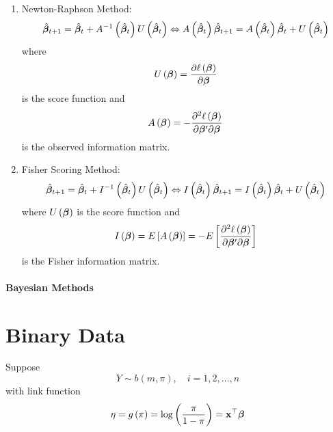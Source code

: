 \begin{enumerate}
	\item Newton-Raphson Method:
	      \begin{equation}
		      \hat{\boldsymbol{\beta}}_{t+1}=\hat{\boldsymbol{\beta}}_{t}+A^{-1}\left(\hat{\boldsymbol{\beta}}_{t}\right)U\left(\hat{\boldsymbol{\beta}}_{t}\right)\Leftrightarrow A\left(\hat{\boldsymbol{\beta}}_{t}\right)\hat{\boldsymbol{\beta}}_{t+1}=A\left(\hat{\boldsymbol{\beta}}_{t}\right)\hat{\boldsymbol{\beta}}_{t}+U\left(\hat{\boldsymbol{\beta}}_{t}\right)
	      \end{equation}
	      where
	      \begin{equation}
		      U\left(\boldsymbol{\beta}\right)=\frac{\partial\ell\left(\boldsymbol{\beta}\right)}{\partial\boldsymbol{\beta}}
	      \end{equation}
	      is the score function and
	      \begin{equation}
		      A\left(\boldsymbol{\beta}\right)=-\frac{\partial^{2}\ell\left(\boldsymbol{\beta}\right)}{\partial\boldsymbol{\beta}^{\prime}\partial\boldsymbol{\beta}}
	      \end{equation}
	      is the observed information matrix.
	\item Fisher Scoring Method:
	      \begin{equation}
		      \hat{\boldsymbol{\beta}}_{t+1}=\hat{\boldsymbol{\beta}}_{t}+I^{-1}\left(\hat{\boldsymbol{\beta}}_{t}\right)U\left(\hat{\boldsymbol{\beta}}_{t}\right)\Leftrightarrow I\left(\hat{\boldsymbol{\beta}}_{t}\right)\hat{\boldsymbol{\beta}}_{t+1}=I\left(\hat{\boldsymbol{\beta}}_{t}\right)\hat{\boldsymbol{\beta}}_{t}+U\left(\hat{\boldsymbol{\beta}}_{t}\right)
	      \end{equation}
	      where $U\left(\boldsymbol{\beta}\right)$ is the score function and
	      \begin{equation}
		      I\left(\boldsymbol{\beta}\right)=E\left[A\left(\boldsymbol{\beta}\right)\right]=-E\left[\frac{\partial^{2}\ell\left(\boldsymbol{\beta}\right)}{\partial\boldsymbol{\beta}^{\prime}\partial\boldsymbol{\beta}}\right]
	      \end{equation}
	      is the Fisher information matrix.
\end{enumerate}

\paragraph{Bayesian Methods}

\section{Binary Data}

Suppose
\begin{equation}
	Y\sim b\left(m,\pi\right),\quad i=1,2,\ldots,n
\end{equation}
with link function
\begin{equation}
	\eta=g\left(\pi\right)=\log\left(\frac{\pi}{1-\pi}\right)={\bf x}^{\top}\boldsymbol{\beta}
\end{equation}
\begin{remark}

\end{remark}

